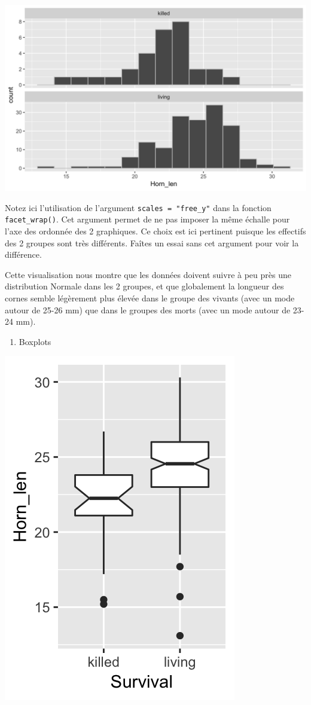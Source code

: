 \documentclass[a4paperpaper,]{article}
\newenvironment{Shaded}{\begin{snugshade}}{\end{snugshade}}
\newcommand{\DataTypeTok}[1]{\textcolor[rgb]{0.00,0.34,0.68}{#1}}
\newcommand{\KeywordTok}[1]{\textcolor[rgb]{0.12,0.11,0.11}{\textbf{#1}}}
\newcommand{\NormalTok}[1]{\textcolor[rgb]{0.12,0.11,0.11}{#1}}
\newcommand{\OperatorTok}[1]{\textcolor[rgb]{0.12,0.11,0.11}{#1}}
\newcommand{\OtherTok}[1]{\textcolor[rgb]{0.00,0.43,0.16}{#1}}
\newcommand{\StringTok}[1]{\textcolor[rgb]{0.75,0.01,0.01}{#1}}
\providecommand{\tightlist}{%
  \setlength{\itemsep}{0pt}\setlength{\parskip}{0pt}}
\begin{document}
\begin{center}\includegraphics[width=0.9\linewidth]{figure/unnamed-chunk-51-1} \end{center}

Notez ici l'utilisation de l'argument \texttt{scales\ =\ "free\_y"} dans la fonction \texttt{facet\_wrap()}. Cet argument permet de ne pas imposer la même échalle pour l'axe des ordonnée des 2 graphiques. Ce choix est ici pertinent puisque les effectifs des 2 groupes sont très différents. Faîtes un essai sans cet argument pour voir la différence.

Cette visualisation nous montre que les données doivent suivre à peu près une distribution Normale dans les 2 groupes, et que globalement la longueur des cornes semble légèrement plus élevée dans le groupe des vivants (avec un mode autour de 25-26 mm) que dans le groupes des morts (avec un mode autour de 23-24 mm).

\begin{enumerate}
\def\labelenumi{\arabic{enumi}.}
\setcounter{enumi}{2}
\tightlist
\item
  Boxplots
\end{enumerate}

\begin{Shaded}
\end{Shaded}

\begin{center}\includegraphics[width=0.25\linewidth]{figure/unnamed-chunk-52-1} \end{center}
\end{document}
